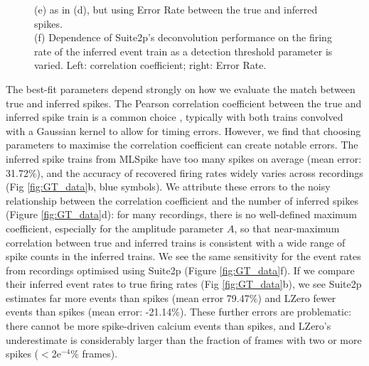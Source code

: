 \documentclass[a4paper,11pt]{article}
\begin{document}
\begin{figure}
{		(e) as in (d), but using Error Rate between the true and inferred spikes. \\
		(f) Dependence of Suite2p's deconvolution performance on the firing rate of the inferred event train as a detection threshold parameter is varied. Left: correlation coefficient; right: Error Rate.
	}
\end{figure}

The best-fit parameters depend strongly on how we evaluate the match between true and inferred spikes. The Pearson correlation coefficient between the true and inferred spike train is a common choice \citep{Brown2004-tj, Paiva2010-qv,Theis2016-ee, Reynolds2018-yh, Berens2018-su}, typically with both trains convolved with a Gaussian kernel to allow for timing errors. However, we find that choosing parameters to maximise the correlation coefficient can create notable errors. The inferred spike trains from MLSpike have too many spikes on average (mean error: 31.72$\%$), and the accuracy of recovered firing rates widely varies across recordings (Fig \ref{fig:GT_data}b, blue symbols). We attribute these errors to the noisy relationship between the correlation coefficient and the number of inferred spikes (Figure \ref{fig:GT_data}d): for many recordings, there is no well-defined maximum coefficient, especially for the amplitude parameter $A$, so that near-maximum correlation between true and inferred trains is consistent with a wide range of spike counts in the inferred trains. We see the same sensitivity for the event rates from recordings optimised using Suite2p (Figure \ref{fig:GT_data}f). If we compare their inferred event rates to true firing rates (Fig \ref{fig:GT_data}b), we see Suite2p estimates far more events than spikes (mean error 79.47$\%$) and LZero fewer events than spikes (mean error: -21.14$\%$). These further errors are problematic: there cannot be more spike-driven calcium events than spikes, and LZero's underestimate is considerably larger than the fraction of frames with two or more spikes ($<$2e$^{-4}\%$ frames).  
\end{document}
